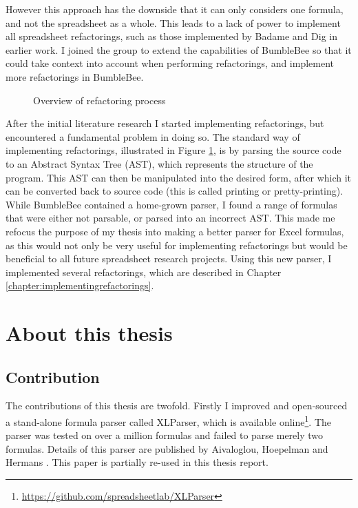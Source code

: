 \documentclass[12pt,a4paper,onecolumn,oneside,parskip]{memoir}
\begin{document}
However this approach has the downside that it can only considers one formula, and not the spreadsheet as a whole.
This leads to a lack of power to implement all spreadsheet refactorings, such as those implemented by Badame and Dig \cite{badame2012refactoring} in earlier work.
I joined the group to extend the capabilities of BumbleBee so that it could take context into account when performing refactorings, and implement more refactorings in BumbleBee.

\begin{figure}
\centerfloat

\caption{Overview of refactoring process}
\label{fig:refactoring-process}
\end{figure}

After the initial literature research I started implementing refactorings, but encountered a fundamental problem in doing so.
The standard way of implementing refactorings, illustrated in Figure \ref{fig:refactoring-process}, is by parsing the source code to an Abstract Syntax Tree (AST), which represents the structure of the program.
This AST can then be manipulated into the desired form, after which it can be converted back to source code (this is called printing or pretty-printing).
While BumbleBee contained a home-grown parser, I found a range of formulas that were either not parsable, or parsed into an incorrect AST.
This made me refocus the purpose of my thesis into making a better parser for Excel formulas, as this would not only be very useful for implementing refactorings but would be beneficial to all future spreadsheet research projects.
Using this new parser, I implemented several refactorings, which are described in Chapter \ref{chapter:implementingrefactorings}.

\section{About this thesis}

\subsection{Contribution}

The contributions of this thesis are twofold.
Firstly I improved and open-sourced a stand-alone formula parser called XLParser, which is available online\footnote{\url{https://github.com/spreadsheetlab/XLParser}}.
The parser was tested on over a million formulas and failed to parse merely two formulas.
Details of this parser are published by Aivaloglou, Hoepelman and Hermans \cite{xlparser}.
This paper is partially re-used in this thesis report.
\end{document}
